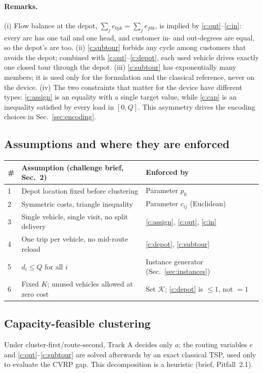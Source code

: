 \documentclass[10pt]{article}
\newcommand{\K}{\mathcal{K}}      %
\begin{document}
\paragraph{Remarks.}
(i) Flow balance at the depot, $\sum_{j} e_{0jk} = \sum_{j} e_{j0k}$, is implied by
\eqref{c:out}--\eqref{c:in}: every arc has one tail and one head, and customer in- and
out-degrees are equal, so the depot's are too.
(ii) \eqref{c:subtour} forbids any cycle among customers that avoids the depot; combined
with \eqref{c:out}--\eqref{c:depot}, each used vehicle drives exactly one closed tour
through the depot.
(iii) \eqref{c:subtour} has exponentially many members; it is used only for the
formulation and the classical reference, never on the device.
(iv) The two constraints that matter for the device have different types:
\eqref{c:assign} is an equality with a single target value, while \eqref{c:cap} is an
inequality satisfied by every load in $[0,Q]$. This asymmetry drives the encoding
choices in Sec.~\ref{sec:encoding}.

\subsection{Assumptions and where they are enforced}
\begin{center}
\begin{tabular}{@{}lll@{}}
\toprule
\# & Assumption (challenge brief, Sec.~2) & Enforced by \\
\midrule
1 & Depot location fixed before clustering & Parameter $p_0$ \\
2 & Symmetric costs, triangle inequality & Parameter $c_{ij}$ (Euclidean) \\
3 & Single vehicle, single visit, no split delivery & \eqref{c:assign}, \eqref{c:out}, \eqref{c:in} \\
4 & One trip per vehicle, no mid-route reload & \eqref{c:depot}, \eqref{c:subtour} \\
5 & $d_i \le Q$ for all $i$ & Instance generator (Sec.~\ref{sec:instances}) \\
6 & Fixed $K$; unused vehicles allowed at zero cost & Set $\K$; \eqref{c:depot} is $\le 1$, not $= 1$ \\
\bottomrule
\end{tabular}
\end{center}

\subsection{Capacity-feasible clustering}
\label{sec:trackA}
Under cluster-first/route-second, Track A decides only $a$; the routing variables $e$ and
\eqref{c:out}--\eqref{c:subtour} are solved afterwards by an exact classical TSP, used only
to evaluate the CVRP gap. This decomposition is a heuristic (brief, Pitfall~2.1).
\end{document}
